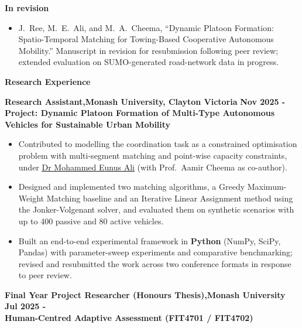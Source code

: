 \documentclass[11pt, a4paper]{article}
\let\hrefnoul\href
\renewcommand{\href}[2]{\hrefnoul{#1}{\ul{#2}}}
\newcommand{\resumesection}[1]{%
  \vspace{6pt}\par
  {\setlength{\fboxsep}{5pt}%
   \noindent\colorbox{sectionbg}{%
     \parbox{\dimexpr\linewidth-10pt\relax}{\strut\textbf{\large #1}\strut}%
   }}%
  \vspace{2pt}\par
}
\begin{document}
\vspace{1pt}
\noindent\textbf{In revision}
\begin{itemize}[leftmargin=1.5em, itemsep=2pt, topsep=1pt, parsep=0pt]
  \item J.~Ree, M.~E.~Ali, and M.~A.~Cheema, ``Dynamic Platoon Formation: Spatio-Temporal
        Matching for Towing-Based Cooperative Autonomous Mobility.'' Manuscript in revision for
        resubmission following peer review; extended evaluation on SUMO-generated road-network
        data in progress.
\end{itemize}

\resumesection{Research Experience}

\noindent\textbf{Research Assistant,\quad Monash University, Clayton Victoria}%
\hfill\textbf{Nov 2025 -}\\
\textbf{Project: Dynamic Platoon Formation of Multi-Type Autonomous Vehicles for Sustainable Urban Mobility}

\begin{itemize}[leftmargin=1.5em, itemsep=2pt, topsep=1pt, parsep=0pt]
  \item Contributed to modelling the coordination task as a constrained optimisation problem
        with multi-segment matching and point-wise capacity constraints, under
        \href{https://research.monash.edu/en/persons/eunus-ali}{Dr Mohammed Eunus Ali}
        (with Prof.~Aamir Cheema as co-author).

  \item Designed and implemented two matching algorithms, a Greedy Maximum-Weight Matching
        baseline and an Iterative Linear Assignment method using the Jonker-Volgenant solver,
        and evaluated them on synthetic scenarios with up to 400 passive and 80 active vehicles.

  \item Built an end-to-end experimental framework in \textbf{Python} (NumPy, SciPy, Pandas)
        with parameter-sweep experiments and comparative benchmarking; revised and resubmitted
        the work across two conference formats in response to peer review.
\end{itemize}

\vspace{3pt}
\noindent\textbf{Final Year Project Researcher (Honours Thesis),\quad Monash University}%
\hfill\textbf{Jul 2025 -}\\
\textbf{Human-Centred Adaptive Assessment (FIT4701 / FIT4702)}
\end{document}
